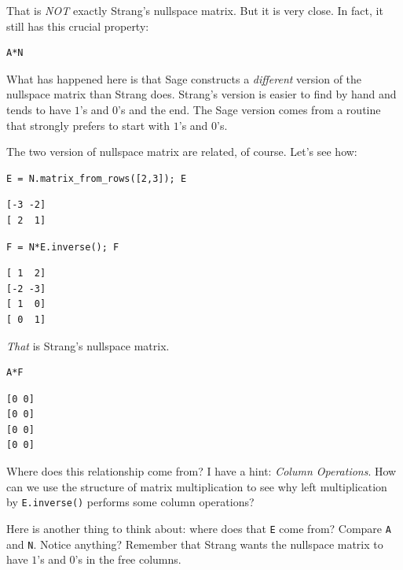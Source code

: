 \documentclass[10pt,]{book}
\theoremstyle{plain}
\theoremstyle{definition}
\numberwithin{equation}{section}
\begin{document}
      That is \emph{NOT} exactly Strang's nullspace matrix. But it is very close.
      In fact, it still has this crucial property:
\begin{lstlisting}[style=sageinput]
A*N
\end{lstlisting}
\par

      What has happened here is that Sage constructs a \emph{different} version
      of the nullspace matrix than Strang does. Strang's version is easier to
      find by hand and tends to have \(1\)'s and \(0\)'s and the end.
      The Sage version comes from a routine that strongly prefers to
      start with \(1\)'s and \(0\)'s.
\par

      The two version of nullspace matrix are related, of course. Let's see how:
\begin{lstlisting}[style=sageinput]
E = N.matrix_from_rows([2,3]); E
\end{lstlisting}
\begin{lstlisting}[style=sageoutput]
[-3 -2]
[ 2  1]
\end{lstlisting}
\begin{lstlisting}[style=sageinput]
F = N*E.inverse(); F
\end{lstlisting}
\begin{lstlisting}[style=sageoutput]
[ 1  2]
[-2 -3]
[ 1  0]
[ 0  1]
\end{lstlisting}
\par

      \emph{That} is Strang's nullspace matrix.
\begin{lstlisting}[style=sageinput]
A*F
\end{lstlisting}
\begin{lstlisting}[style=sageoutput]
[0 0]
[0 0]
[0 0]
[0 0]
\end{lstlisting}
\par

      Where does this relationship come from? I have a hint: \emph{Column Operations}.
      How can we use the structure of matrix multiplication to see why left multiplication
      by \verb?E.inverse()? performs some column operations?
\par

      Here is another thing to think about: where does that \verb?E? come from?
      Compare \verb?A? and \verb?N?. Notice anything? Remember that Strang wants
      the nullspace matrix to have \(1\)'s and \(0\)'s in the free columns.
\typeout{************************************************}
\typeout{************************************************}
\end{document}
